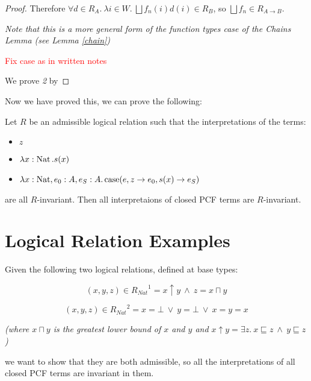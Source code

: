 \begin{proof}
Therefore $\forall d \in R_A. \ \lambda i \in W. \ \bigsqcup f_n(i)d(i) \in R_B$, so $\bigsqcup f_n \in R_{A \to B}$.

\emph{Note that this is a more general form of the function types case of the Chains Lemma (see Lemma \ref{chain})}

\vspace{0.5cm}

\textcolor{red}{Fix case as in written notes}

We prove \emph{2} by 
\end{proof}


Now we have proved this, we can prove the following:

\vspace{0.5cm}

\begin{thm}{\citep{Streicher06}}
Let $R$ be an admissible logical relation such that the interpretations of the terms:

\begin{itemize}
\item{$z$}
\item{$\lambda x: \operatorname{Nat}. s(x)$}
\item{$\lambda x: \operatorname{Nat}, e_0 : A, e_S: A. \operatorname{case}(e,z \to e_0,s(x) \to e_S)$}
\end{itemize}

are all $R$-invariant. Then all interpretaions of closed PCF terms are $R$-invariant.
\end{thm}

\section{Logical Relation Examples}
Given the following two logical relations, defined at base types:

\[ (x,y,z) \in {R_{Nat}}^1 = x \uparrow y \ \wedge \ z = x \sqcap y\]

\[ (x,y,z) \in {R_{Nat}}^2 = x = \bot \ \vee \ y = \bot \ \vee \ x=y=x \]

\emph{(where $x \sqcap y$ is the greatest lower bound of $x$ and $y$ and $x \uparrow y = \exists z. \ x \sqsubseteq z \ \wedge \ y \sqsubseteq z$)}

we want to show that they are both admissible, so all the interpretations of all closed PCF terms are invariant in them. 

